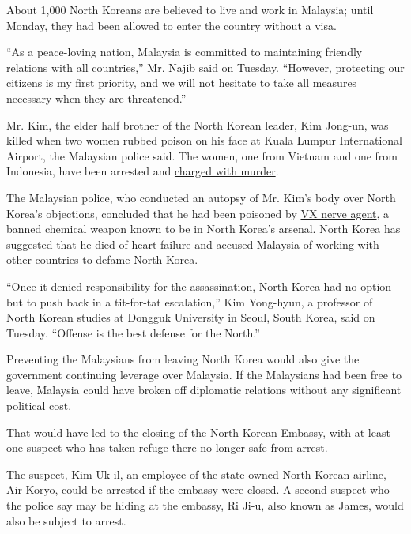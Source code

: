 About 1,000 North Koreans are believed to live and work in Malaysia;
until Monday, they had been allowed to enter the country without a visa.

``As a peace-loving nation, Malaysia is committed to maintaining
friendly relations with all countries,'' Mr. Najib said on Tuesday.
``However, protecting our citizens is my first priority, and we will not
hesitate to take all measures necessary when they are threatened.''

Mr. Kim, the elder half brother of the North Korean leader, Kim Jong-un,
was killed when two women rubbed poison on his face at Kuala Lumpur
International Airport, the Malaysian police said. The women, one from
Vietnam and one from Indonesia, have been arrested and
\href{https://www.nytimes3xbfgragh.onion/2017/02/28/world/asia/north-korea-kim-jong-nam-death.html}{charged
with murder}.

The Malaysian police, who conducted an autopsy of Mr. Kim's body over
North Korea's objections, concluded that he had been poisoned by
\href{https://www.nytimes3xbfgragh.onion/2017/02/24/world/asia/vx-nerve-agent-kim-jong-nam.html}{VX
nerve agent}, a banned chemical weapon known to be in North Korea's
arsenal. North Korea has suggested that he
\href{https://www.nytimes3xbfgragh.onion/2017/03/01/world/asia/kim-jong-nam-assassination-north-korea-visa-malaysia.html}{died
of heart failure} and accused Malaysia of working with other countries
to defame North Korea.

``Once it denied responsibility for the assassination, North Korea had
no option but to push back in a tit-for-tat escalation,'' Kim Yong-hyun,
a professor of North Korean studies at Dongguk University in Seoul,
South Korea, said on Tuesday. ``Offense is the best defense for the
North.''

Preventing the Malaysians from leaving North Korea would also give the
government continuing leverage over Malaysia. If the Malaysians had been
free to leave, Malaysia could have broken off diplomatic relations
without any significant political cost.

That would have led to the closing of the North Korean Embassy, with at
least one suspect who has taken refuge there no longer safe from arrest.

The suspect, Kim Uk-il, an employee of the state-owned North Korean
airline, Air Koryo, could be arrested if the embassy were closed. A
second suspect who the police say may be hiding at the embassy, Ri Ji-u,
also known as James, would also be subject to arrest.

